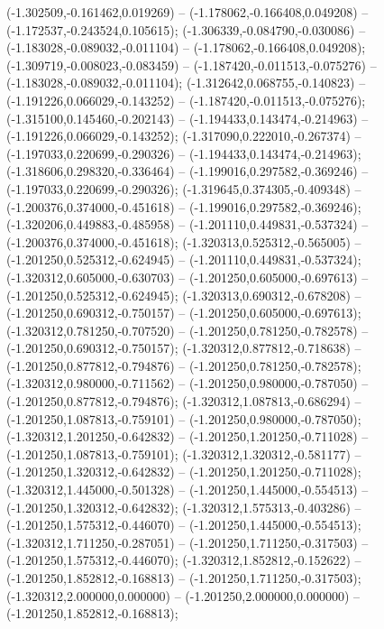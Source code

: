  (-1.302509,-0.161462,0.019269) -- (-1.178062,-0.166408,0.049208) -- (-1.172537,-0.243524,0.105615);
 (-1.306339,-0.084790,-0.030086) -- (-1.183028,-0.089032,-0.011104) -- (-1.178062,-0.166408,0.049208);
 (-1.309719,-0.008023,-0.083459) -- (-1.187420,-0.011513,-0.075276) -- (-1.183028,-0.089032,-0.011104);
 (-1.312642,0.068755,-0.140823) -- (-1.191226,0.066029,-0.143252) -- (-1.187420,-0.011513,-0.075276);
 (-1.315100,0.145460,-0.202143) -- (-1.194433,0.143474,-0.214963) -- (-1.191226,0.066029,-0.143252);
 (-1.317090,0.222010,-0.267374) -- (-1.197033,0.220699,-0.290326) -- (-1.194433,0.143474,-0.214963);
 (-1.318606,0.298320,-0.336464) -- (-1.199016,0.297582,-0.369246) -- (-1.197033,0.220699,-0.290326);
 (-1.319645,0.374305,-0.409348) -- (-1.200376,0.374000,-0.451618) -- (-1.199016,0.297582,-0.369246);
 (-1.320206,0.449883,-0.485958) -- (-1.201110,0.449831,-0.537324) -- (-1.200376,0.374000,-0.451618);
 (-1.320313,0.525312,-0.565005) -- (-1.201250,0.525312,-0.624945) -- (-1.201110,0.449831,-0.537324);
 (-1.320312,0.605000,-0.630703) -- (-1.201250,0.605000,-0.697613) -- (-1.201250,0.525312,-0.624945);
 (-1.320313,0.690312,-0.678208) -- (-1.201250,0.690312,-0.750157) -- (-1.201250,0.605000,-0.697613);
 (-1.320312,0.781250,-0.707520) -- (-1.201250,0.781250,-0.782578) -- (-1.201250,0.690312,-0.750157);
 (-1.320312,0.877812,-0.718638) -- (-1.201250,0.877812,-0.794876) -- (-1.201250,0.781250,-0.782578);
 (-1.320312,0.980000,-0.711562) -- (-1.201250,0.980000,-0.787050) -- (-1.201250,0.877812,-0.794876);
 (-1.320312,1.087813,-0.686294) -- (-1.201250,1.087813,-0.759101) -- (-1.201250,0.980000,-0.787050);
 (-1.320312,1.201250,-0.642832) -- (-1.201250,1.201250,-0.711028) -- (-1.201250,1.087813,-0.759101);
 (-1.320312,1.320312,-0.581177) -- (-1.201250,1.320312,-0.642832) -- (-1.201250,1.201250,-0.711028);
 (-1.320312,1.445000,-0.501328) -- (-1.201250,1.445000,-0.554513) -- (-1.201250,1.320312,-0.642832);
 (-1.320312,1.575313,-0.403286) -- (-1.201250,1.575312,-0.446070) -- (-1.201250,1.445000,-0.554513);
 (-1.320312,1.711250,-0.287051) -- (-1.201250,1.711250,-0.317503) -- (-1.201250,1.575312,-0.446070);
 (-1.320312,1.852812,-0.152622) -- (-1.201250,1.852812,-0.168813) -- (-1.201250,1.711250,-0.317503);
 (-1.320312,2.000000,0.000000) -- (-1.201250,2.000000,0.000000) -- (-1.201250,1.852812,-0.168813);
